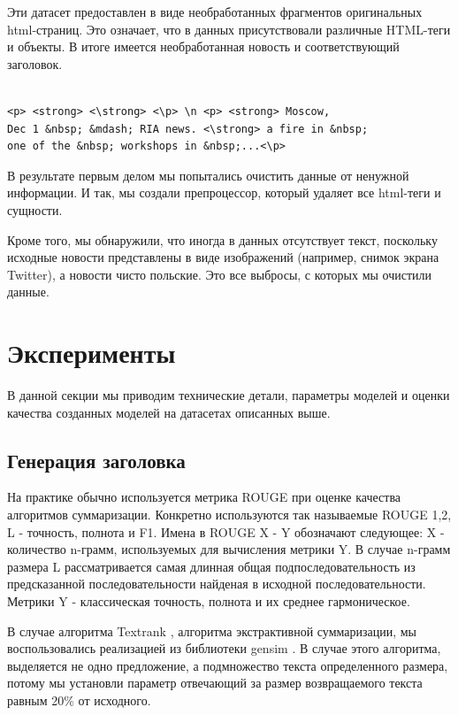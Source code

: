 \documentclass[aps,%
12pt,%
final,%
oneside,
onecolumn,%
musixtex, %
superscriptaddress,%
centertags]{article} %
\begin{document}
Эти датасет предоставлен в виде необработанных фрагментов оригинальных html-страниц.
Это означает, что в данных присутствовали различные HTML-теги и объекты.
В итоге имеется необработанная новость и соответствующий заголовок.

\begin{verbatim}

<p> <strong> <\strong> <\p> \n <p> <strong> Moscow,
Dec 1 &nbsp; &mdash; RIA news. <\strong> a fire in &nbsp;
one of the &nbsp; workshops in &nbsp;...<\p>
\end{verbatim}

В результате первым делом мы попытались очистить данные от ненужной информации. И так, мы создали препроцессор, который удаляет все html-теги и сущности.

Кроме того, мы обнаружили, что иногда в данных отсутствует текст, поскольку исходные новости представлены в виде изображений (например, снимок экрана Twitter), а новости чисто польские. Это все выбросы, с которых мы очистили данные.


\section{Эксперименты}
В данной секции мы приводим технические детали, параметры моделей и оценки качества созданных моделей на датасетах описанных выше.

\subsection{Генерация заголовка}
На практике обычно используется метрика ROUGE \cite{Lin: 2004} при оценке качества алгоритмов суммаризации. Конкретно используются так называемые ROUGE 1,2, L - точность, полнота и F1. Имена в ROUGE X - Y обозначают следующее: X - количество n-грамм, используемых для вычисления метрики Y. В случае n-грамм размера L рассматривается самая длинная общая подпоследовательность из предсказанной последовательности найденая в исходной последовательности. Метрики Y - классическая точность, полнота и их среднее гармоническое.

В случае алгоритма Textrank \cite{DBLP:journals/corr/BarriosLAW16}, алгоритма экстрактивной суммаризации, мы воспользовались реализацией из библиотеки gensim \cite{rehurek_lrec}. В случае этого алгоритма, выделяется не одно предложение, а подмножество текста определенного размера, потому мы установли параметр отвечающий за размер возвращаемого текста равным 20\% от исходного.
\end{document}
